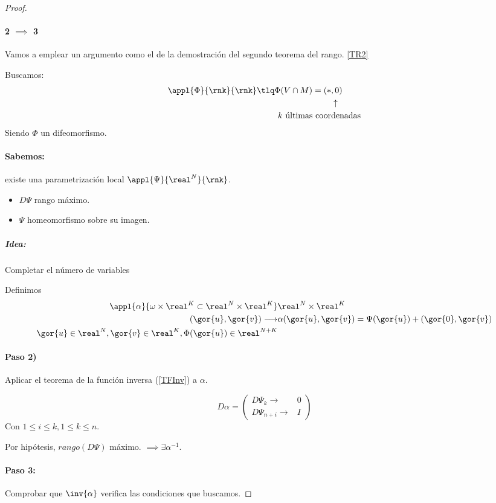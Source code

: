 \begin{proof}
\paragraph{2 $\implies$ 3} Vamos a emplear un argumento como el de la demostración del segundo teorema del rango. \ref{TR2}

Buscamos: 
\begin{align*}
\appl{\Phi}{\rnk}{\rnk} \tlq \Phi(V\cap M) = (\ast &,0)\\
&\uparrow\\
k \text{ últimas coor} & \text{denadas}
\end{align*}
Siendo $\Phi$ un difeomorfismo.

\paragraph{Sabemos:} existe una parametrización local $\appl{\Psi}{\real^N}{\rnk}$.
\begin{itemize}
\item $D\Psi$ rango máximo.
\item $\Psi$ homeomorfismo sobre su imagen.
\end{itemize}

\subparagraph{Idea:} Completar el número de variables

Definimos 
\begin{align*}
\appl{\alpha}{\omega\times\real^K \subset \real^N\times\real^K}&{\real^N\times\real^K}\\
(\gor{u},\gor{v})\longrightarrow &\alpha(\gor{u},\gor{v}) = \Psi(\gor{u}) + (\gor{0},\gor{v})\\
\gor{u} \in \real^N,\gor{v} \in \real^K, \Phi(\gor{u})\in \real^{N+K}
\end{align*}

\paragraph{Paso 2)} Aplicar el teorema de la función inversa (\ref{TFInv}) a $\alpha$.

\[D\alpha =
\left(
	\begin{array}{c|c}
		D\Psi_k  \rightarrow & 0\\
		\hline
		D\Psi_{n+i}  \rightarrow & I
	\end{array}
\right)
\]
Con $1\leq i \leq k,1\leq k \leq n$.

Por hipótesis, $rango(D\Psi)$ máximo. $\implies \exists \alpha^{-1}$.

\paragraph{Paso 3:} Comprobar que $\inv{\alpha}$ verifica las condiciones que buscamos.


\end{proof}
